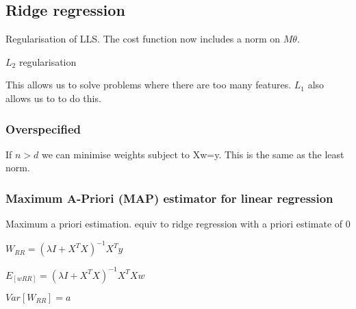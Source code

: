 
\subsection{Ridge regression}

Regularisation of LLS. The cost function now includes a norm on \(M\theta \).

\(L_2\) regularisation

This allows us to solve problems where there are too many features. \(L_1\) also allows us to to do this.

\subsubsection{Overspecified}

If \(n>d\) we can minimise weights subject to Xw=y. This is the same as the least norm.

\subsubsection{Maximum A-Priori (MAP) estimator for linear regression}

Maximum a priori estimation. equiv to ridge regression with a priori estimate of \(0\)

\(W_{RR}=(\lambda I+X^TX)^{-1}X^Ty\)

\(E_[w{RR}]=(\lambda I+X^TX)^{-1}X^TXw\)

\(Var[W_{RR}]=a\)


